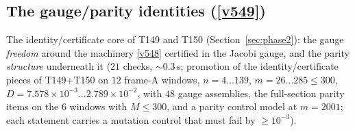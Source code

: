 \documentclass[11pt,a4paper]{article}
\begin{document}
\subsection{The gauge/parity identities (\texorpdfstring{\vref{v549}}{v549})}\label{sec:v549}
The identity/certificate core of T149 and T150 (Section~\ref{sec:phase2}): the gauge
\emph{freedom} around the machinery \vref{v548} certified in the Jacobi gauge, and the parity
\emph{structure} underneath it  ($21$ checks,
${\sim}0.3$\,s; promotion of the identity/certificate pieces of T149+T150 on $12$ frame-A
windows, $n=4\ldots139$, $m=26\ldots285\le300$,
$D=7.578\times10^{-3}\ldots2.789\times10^{-2}$, with $48$ gauge assemblies, the full-section
parity items on the $6$ windows with $M\le300$, and a parity control model at $m=2001$; each
statement carries a mutation control that must fail by $\ge10^{-3}$).
\end{document}
